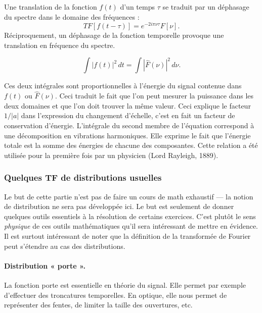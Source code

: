 \begin{prop}
  Une translation de la fonction $f(t)$ d'un temps $\tau$ se traduit par un
  déphasage du spectre dans le domaine des fréquences :
  \[
    TF[f(t-\tau)]=e^{-2i\pi\nu\tau}F[\nu].
  \]
  Réciproquement, un déphasage de la fonction temporelle provoque une
  translation en fréquence du spectre.
\end{prop}

\begin{theorem}
  \[
    \int|f(t)|^2\,dt=\int|\hat{F}(\nu)|^2\,d\nu .
  \]
\end{theorem}

Ces deux intégrales sont proportionnelles à l'énergie du signal contenue dans
$f(t)$ ou $\hat F(\nu)$. Ceci traduit le fait que l'on peut mesurer la puissance
dans les deux domaines et que l'on doit trouver la même valeur. Ceci explique le
facteur $1/|a|$ dans l'expression du changement d'échelle, c'est en fait un
facteur de conservation d'énergie. L'intégrale du second membre de l'équation
correspond à une décomposition en vibrations harmoniques. Elle exprime le fait
que l'énergie totale est la somme des énergies de chacune des composantes. Cette
relation a été utilisée pour la première fois par un physicien (Lord Rayleigh,
1889).

\subsubsection{Quelques TF de distributions usuelles}

Le but de cette partie n'est pas de faire un cours de math exhaustif --- la
notion de distribution ne sera pas développée ici. Le but est seulement de donner
quelques outils essentiels à la résolution de certains exercices. C'est plutôt le
sens \emph{physique} de ces outils mathématiques qu'il sera intéressant de mettre
en évidence. Il est surtout intéressant de noter que la définition de la
transformée de Fourier peut s'étendre au cas des distributions.

\paragraph{Distribution « porte ».} La fonction porte est essentielle en théorie
du signal. Elle permet par exemple d'effectuer des troncatures temporelles. En
optique, elle nous permet de représenter des fentes, de limiter la taille des
ouvertures, etc.

